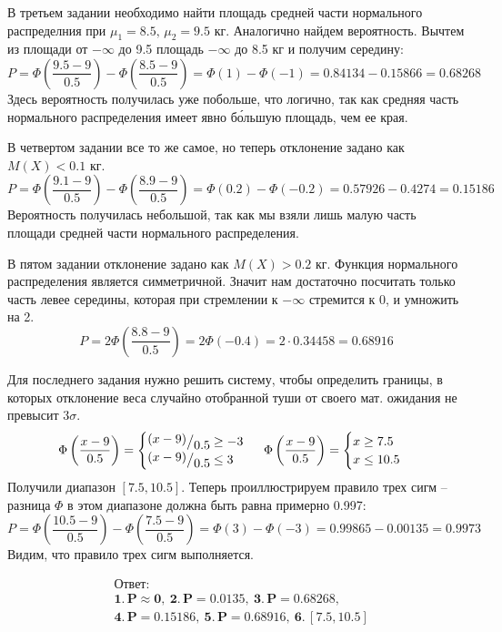 \documentclass[a4paper, 12pt]{article}
\newcommand{\frc}[2]{\raisebox{2pt}{$#1$}\big/\raisebox{-3pt}{$#2$}}
\begin{document}
    В третьем задании необходимо найти площадь средней части нормального распределния при $\mu_1=8.5,\,\mu_2=9.5$ кг.
    Аналогично найдем вероятность. Вычтем из площади от $-\infty$ до 9.5 площадь $-\infty$ до 8.5 кг и получим середину:
    $$
    P=\Phi\left(\dfrac{9.5-9}{0.5}\right)-\Phi\left(\dfrac{8.5-9}{0.5}\right)=\Phi(1)-\Phi(-1)=0.84134-0.15866=0.68268
    $$
    Здесь вероятность получилась уже побольше, что логично, так как средняя часть нормального распределения имеет явно б\'{о}льшую
    площадь, чем ее края.


    В четвертом задании все то же самое, но теперь отклонение задано как $M(X)<0.1$ кг.
    $$
    P=\Phi\left(\dfrac{9.1-9}{0.5}\right)-\Phi\left(\dfrac{8.9-9}{0.5}\right)=\Phi(0.2)-\Phi(-0.2)=0.57926-0.4274=0.15186
    $$
    Вероятность получилась небольшой, так как мы взяли лишь малую часть площади средней части нормального распределения.


    В пятом задании отклонение задано как $M(X)>0.2$ кг. Функция нормального распределения является симметричной.
    Значит нам достаточно посчитать только часть левее середины, которая при стремлении к $-\infty$ стремится к 0,
    и умножить на 2.
    $$
    P=2\Phi\left(\dfrac{8.8-9}{0.5}\right)=2\Phi(-0.4)=2\cdot 0.34458=0.68916
    $$


    Для последнего задания нужно решить систему, чтобы определить границы, в которых отклонение веса случайно
    отобранной туши от своего мат. ожидания не превысит $3\sigma$.
    \begin{align*}
    \Phi\left(\dfrac{x-9}{0.5}\right)=
    \begin{cases}
        \frc{(x-9)}{0.5}\geq -3\\
        \frc{(x-9)}{0.5}\leq 3
    \end{cases}\
    \Phi\left(\dfrac{x-9}{0.5}\right)=
    \begin{cases}
        x\geq 7.5\\
        x\leq 10.5
    \end{cases}
    \end{align*}
    Получили диапазон $[7.5,10.5]$. Теперь проиллюстрируем правило трех сигм -- разница $\Phi$ в этом
    диапазоне должна быть равна примерно 0.997:
    $$
    P=\Phi\left(\dfrac{10.5-9}{0.5}\right)-\Phi\left(\dfrac{7.5-9}{0.5}\right)=\Phi\left(3\right)-\Phi\left(-3\right)=0.99865-0.00135=0.9973
    $$
    Видим, что правило трех сигм выполняется.


    \begin{align*}
        & \textbf{Ответ:}\\
        & \mathbf{1.\,P\approx0,\ 2.\,P=0.0135,\ 3.\,P=0.68268,}\\
        & \mathbf{4.\,P=0.15186,\ 5.\,P=0.68916,\ 6.\,[7.5,10.5]}
    \end{align*}
\end{document}
